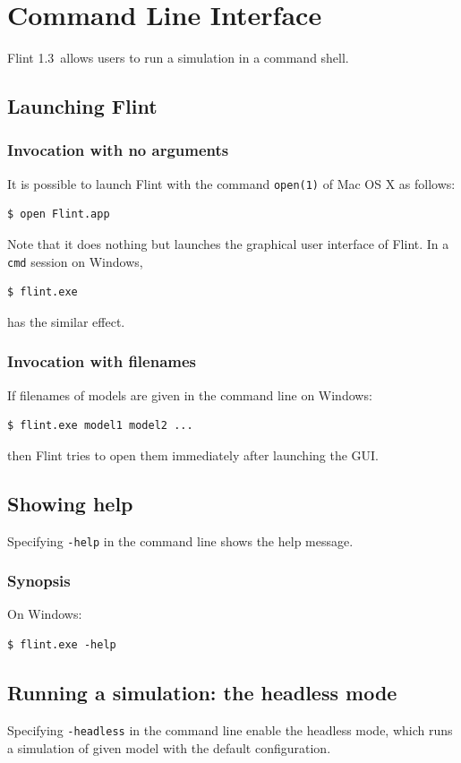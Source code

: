 \documentclass[a4paper,10pt]{report}
\def\FlintVersion{1.3}
\def\Flint{Flint \FlintVersion}
\begin{document}

\chapter{Command Line Interface}
\Flint\ allows users to run a simulation in a command shell.

\section{Launching Flint}

\subsection{Invocation with no arguments}
It is possible to launch Flint with the command {\tt open(1)} of Mac OS X as follows:
\begin{verbatim}
$ open Flint.app
\end{verbatim}
Note that it does nothing but launches the graphical user interface of Flint.
In a {\tt cmd} session on Windows,
\begin{verbatim}
$ flint.exe
\end{verbatim}
has the similar effect.

\subsection{Invocation with filenames}
If filenames of models are given in the command line on Windows:
\begin{verbatim}
$ flint.exe model1 model2 ...
\end{verbatim}
then Flint tries to open them immediately after launching the GUI.

\section{Showing help}
Specifying {\tt -help} in the command line shows the help message.

\subsection{Synopsis}
On Windows:
\begin{verbatim}
$ flint.exe -help
\end{verbatim}

\section{Running a simulation: the headless mode}
Specifying {\tt -headless} in the command line enable the headless mode, which
runs a simulation of given model with the default configuration.
\end{document}
